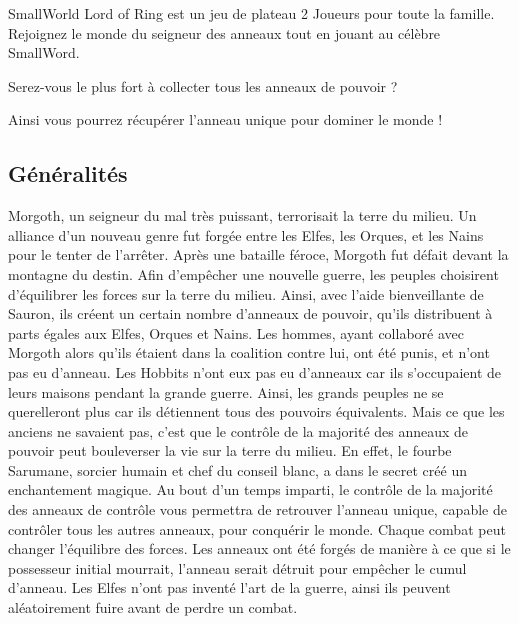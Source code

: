 SmallWorld Lord of Ring est un jeu de plateau 2 Joueurs pour toute la famille. Rejoignez le monde du seigneur des anneaux tout en jouant au célèbre SmallWord.
\newline
\begin{center}
Serez-vous le plus fort à collecter tous les anneaux de pouvoir ?
\end{center}
\begin{center}
Ainsi vous pourrez récupérer l'anneau unique pour dominer le monde !
\end{center}

\subsection{Généralités}

Morgoth, un seigneur du mal très puissant, terrorisait la terre du milieu. Un alliance d'un nouveau genre fut forgée entre les Elfes, les Orques, et les Nains pour le tenter de l'arrêter. Après une bataille féroce, Morgoth fut défait devant la montagne du destin.
\newline
\newline
Afin d'empêcher une nouvelle guerre, les peuples choisirent d'équilibrer les forces sur la terre du milieu. Ainsi, avec l'aide bienveillante de Sauron, ils créent un certain nombre d'anneaux de pouvoir, qu'ils distribuent à parts égales aux Elfes, Orques et Nains.
\newline
 Les hommes, ayant collaboré avec Morgoth alors qu'ils étaient dans la coalition contre lui, ont été punis, et n'ont pas eu d'anneau. Les Hobbits n'ont eux pas eu d'anneaux car ils s'occupaient de leurs maisons pendant la grande guerre.
\newline
\newline
Ainsi, les grands peuples ne se querelleront plus car ils détiennent tous des pouvoirs équivalents.
\newline
\newline
Mais ce que les anciens ne savaient pas, c'est que le contrôle de la majorité des anneaux de pouvoir peut bouleverser la vie sur la terre du milieu. En effet, le fourbe Sarumane, sorcier humain et chef du conseil blanc, a dans le secret créé un enchantement magique. Au bout d'un temps imparti, le contrôle de la majorité des anneaux de contrôle vous permettra de retrouver l'anneau unique, capable de contrôler tous les autres anneaux, pour conquérir le monde.
\newline
\newline
Chaque combat peut changer l'équilibre des forces. Les anneaux ont été forgés de manière à ce que si le possesseur initial mourrait, l'anneau serait détruit pour empêcher le cumul d'anneau. Les Elfes n'ont pas inventé l'art de la guerre, ainsi ils peuvent aléatoirement fuire avant de perdre un combat. 
